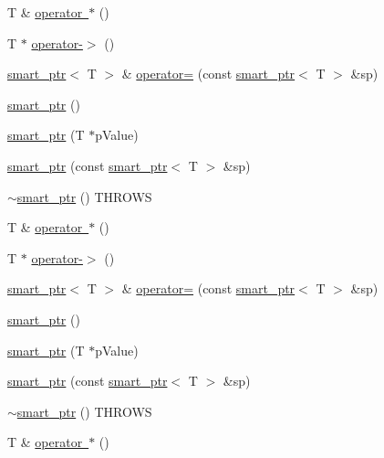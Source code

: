 \begin{DoxyCompactItemize}
T \& \mbox{\hyperlink{classfakeit_1_1smart__ptr_a6ad907f45c59a2519248f5a79191992e}{operator $\ast$}} ()
\item 
T $\ast$ \mbox{\hyperlink{classfakeit_1_1smart__ptr_aa9b3019d80eee2f376a9b92ef8080ffc}{operator-\/$>$}} ()
\item 
\mbox{\hyperlink{classfakeit_1_1smart__ptr}{smart\+\_\+ptr}}$<$ T $>$ \& \mbox{\hyperlink{classfakeit_1_1smart__ptr_a76edf2172f564378c77dc88a419f6634}{operator=}} (const \mbox{\hyperlink{classfakeit_1_1smart__ptr}{smart\+\_\+ptr}}$<$ T $>$ \&sp)
\item 
\mbox{\hyperlink{classfakeit_1_1smart__ptr_ad718f001e0b0815c80d5cef4f2d4a99a}{smart\+\_\+ptr}} ()
\item 
\mbox{\hyperlink{classfakeit_1_1smart__ptr_afa05248e2dceb62a7ecc706700cfd1bf}{smart\+\_\+ptr}} (T $\ast$p\+Value)
\item 
\mbox{\hyperlink{classfakeit_1_1smart__ptr_a1157d28b4675e32ae90886871fb1b0bd}{smart\+\_\+ptr}} (const \mbox{\hyperlink{classfakeit_1_1smart__ptr}{smart\+\_\+ptr}}$<$ T $>$ \&sp)
\item 
\mbox{\hyperlink{classfakeit_1_1smart__ptr_a0a184c081564a5a22d8ad0a121614bc5}{$\sim$smart\+\_\+ptr}} () T\+H\+R\+O\+WS
\item 
T \& \mbox{\hyperlink{classfakeit_1_1smart__ptr_a6ad907f45c59a2519248f5a79191992e}{operator $\ast$}} ()
\item 
T $\ast$ \mbox{\hyperlink{classfakeit_1_1smart__ptr_aa9b3019d80eee2f376a9b92ef8080ffc}{operator-\/$>$}} ()
\item 
\mbox{\hyperlink{classfakeit_1_1smart__ptr}{smart\+\_\+ptr}}$<$ T $>$ \& \mbox{\hyperlink{classfakeit_1_1smart__ptr_a76edf2172f564378c77dc88a419f6634}{operator=}} (const \mbox{\hyperlink{classfakeit_1_1smart__ptr}{smart\+\_\+ptr}}$<$ T $>$ \&sp)
\item 
\mbox{\hyperlink{classfakeit_1_1smart__ptr_ad718f001e0b0815c80d5cef4f2d4a99a}{smart\+\_\+ptr}} ()
\item 
\mbox{\hyperlink{classfakeit_1_1smart__ptr_afa05248e2dceb62a7ecc706700cfd1bf}{smart\+\_\+ptr}} (T $\ast$p\+Value)
\item 
\mbox{\hyperlink{classfakeit_1_1smart__ptr_a1157d28b4675e32ae90886871fb1b0bd}{smart\+\_\+ptr}} (const \mbox{\hyperlink{classfakeit_1_1smart__ptr}{smart\+\_\+ptr}}$<$ T $>$ \&sp)
\item 
\mbox{\hyperlink{classfakeit_1_1smart__ptr_a0a184c081564a5a22d8ad0a121614bc5}{$\sim$smart\+\_\+ptr}} () T\+H\+R\+O\+WS
\item 
T \& \mbox{\hyperlink{classfakeit_1_1smart__ptr_a6ad907f45c59a2519248f5a79191992e}{operator $\ast$}} ()

\end{DoxyCompactItemize}
